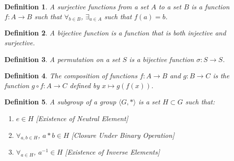 \documentclass{article}
\theoremstyle{mystyle}
\newtheorem{definition}{Definition}[section]
\begin{document}
\begin{definition}
A surjective functions from a set $A$ to a set $B$ is a function $f:A\rightarrow B$ such that $\forall_{b\in B}$, $\exists_{a\in A}$ such that $f(a) = b$.
\end{definition}
\begin{definition}
A bijective function is a function that is both injective and surjective.
\end{definition}
\begin{definition}
A permutation on a set $S$ is a bijective function $\sigma:S\rightarrow S$.
\end{definition}
\begin{definition}
The composition of functions $f:A\rightarrow B$ and $g:B\rightarrow C$ is the function $g\circ f:A\rightarrow C$ defined by $x\mapsto g(f(x))$.
\end{definition}
\begin{definition}
A subgroup of a group $\langle G,*\rangle$ is a set $H\subset G$ such that:
\begin{enumerate}
    \item $e\in H$ \hfill [Existence of Neutral Element]
    \item $\forall_{a,b\in H}$, $a*b \in H$ \hfill [Closure Under Binary Operation]
    \item $\forall_{a\in H}$, $a^{-1}\in H$ \hfill [Existence of Inverse Elements]
\end{enumerate}
\end{definition}
\end{document}
